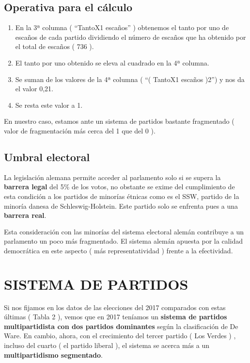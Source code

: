 \documentclass[
]{article}
\providecommand{\tightlist}{%
  \setlength{\itemsep}{0pt}\setlength{\parskip}{0pt}}
\begin{document}
\hypertarget{operativa-para-el-cuxe1lculo}{%
\subsection{Operativa para el
cálculo}\label{operativa-para-el-cuxe1lculo}}

\begin{enumerate}
\def\labelenumi{\arabic{enumi}.}
\tightlist
\item
  En la 3ª columna ( ``TantoX1 escaños'' ) obtenemos el tanto por uno de
  escaños de cada partido dividiendo el número de escaños que ha
  obtenido por el total de escaños ( 736 ).
\item
  El tanto por uno obtenido se eleva al cuadrado en la 4ª columna.
\item
  Se suman de los valores de la 4ª columna ( ``( TantoX1 escaños )2'') y
  nos da el valor 0,21.
\item
  Se resta este valor a 1.
\end{enumerate}

En nuestro caso, estamos ante un sistema de partidos bastante
fragmentado ( valor de fragmentación más cerca del 1 que del 0 ).

\hypertarget{umbral-electoral}{%
\subsection{Umbral electoral}\label{umbral-electoral}}

La legislación alemana permite acceder al parlamento solo si se supera
la \textbf{barrera legal} del 5\% de los votos, no obstante se exime del
cumplimiento de esta condición a los partidos de minorías étnicas como
es el SSW, partido de la minoría danesa de Schleswig-Holstein. Este
partido solo se enfrenta pues a una \textbf{barrera real}.

Esta consideración con las minorías del sistema electoral alemán
contribuye a un parlamento un poco más fragmentado. El sistema alemán
apuesta por la calidad democrática en este aspecto ( más
representatividad ) frente a la efectividad.

\hypertarget{sistema-de-partidos}{%
\section{SISTEMA DE PARTIDOS}\label{sistema-de-partidos}}

Si nos fijamos en los datos de las elecciones del 2017 comparados con
estas últimas ( Tabla 2 ), vemos que en 2017 teníamos un \textbf{sistema
de partidos multipartidista con dos partidos dominantes} según la
clasificación de De Ware. En cambio, ahora, con el crecimiento del
tercer partido ( Los Verdes ) , incluso del cuarto ( el partido liberal
), el sistema se acerca más a un \textbf{multipartidismo segmentado}.
\end{document}
